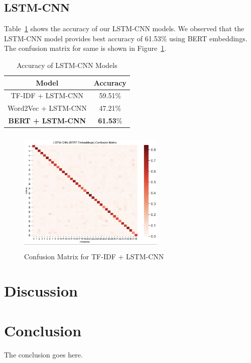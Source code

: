 \documentclass[conference]{IEEEtran}
\begin{document}
\subsection{LSTM-CNN}

Table~\ref{tab: lstm_cnn_models} shows the accuracy of our LSTM-CNN models. We observed that the LSTM-CNN model provides best accuracy of 61.53\% using BERT embeddings. The confusion matrix for same is shown in Figure~\ref{fig:lstm_cnn}.

\begin{table}[!htb]
\centering
\caption{Accuracy of LSTM-CNN Models}
\label{tab: lstm_cnn_models}
\begin{tabular}{c|c}\midrule\midrule
Model & Accuracy\\ \midrule
TF-IDF + LSTM-CNN & 59.51\% \\
Word2Vec + LSTM-CNN & 47.21\% \\
\textbf{BERT + LSTM-CNN} & \textbf{61.53}\% \\ \midrule\midrule
\end{tabular}
\end{table}

\begin{figure}[!htb]
\centering
\includegraphics[width=70mm, height = 60mm]{Images/LSTM-CNN.png}
\caption{Confusion Matrix for TF-IDF + LSTM-CNN}\label{fig:lstm_cnn}
\end{figure}

\section{Discussion}

\section{Conclusion}
The conclusion goes here.




\end{document}
